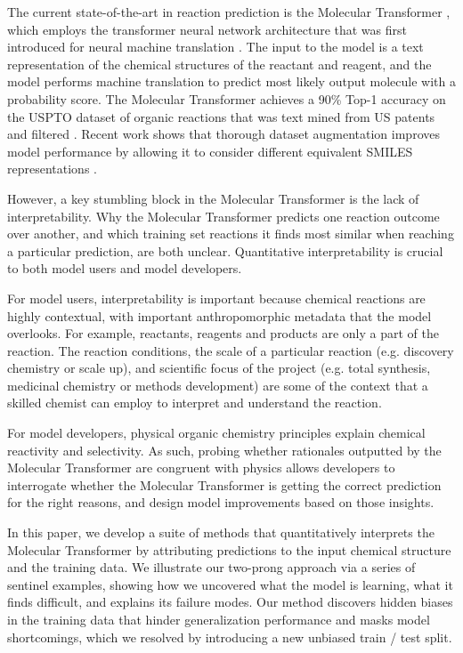 The current state-of-the-art in reaction prediction is the Molecular Transformer \cite{Schwaller2019}, which employs the transformer neural network architecture that was first introduced for neural machine translation \cite{Vaswani2017}. The input to the model is a text representation of the chemical structures of the reactant and reagent, and the model performs machine translation to predict most likely output molecule with a probability score. The Molecular Transformer achieves a 90\% Top-1 accuracy on the USPTO dataset of organic reactions that was text mined from US patents \cite{Lowe2012} and filtered \cite{Jin2017}. Recent work shows that thorough dataset augmentation improves model performance by allowing it to consider different equivalent SMILES representations \cite{tetko2020state}.

However, a key stumbling block in the Molecular Transformer is the lack of interpretability. Why the Molecular Transformer predicts one reaction outcome over another, and which training set reactions it finds most similar when reaching a particular prediction, are both unclear. Quantitative interpretability is crucial to both model users and model developers.

For model users, interpretability is important because chemical reactions are highly contextual, with important anthropomorphic metadata that the model overlooks. For example, reactants, reagents and products are only a part of the reaction. The reaction conditions, the scale of a particular reaction (e.g. discovery chemistry or scale up), and scientific focus of the project (e.g. total synthesis, medicinal chemistry or methods development) are some of the context that a skilled chemist can employ to interpret and understand the reaction.

For model developers, physical organic chemistry principles explain chemical reactivity and selectivity. As such, probing whether rationales outputted by the Molecular Transformer are congruent with physics allows developers to interrogate whether the Molecular Transformer is getting the correct prediction for the right reasons, and design model improvements based on those insights. 

In this paper, we develop a suite of methods that quantitatively interprets the Molecular Transformer by attributing predictions to the input chemical structure and the training data. We illustrate our two-prong approach via a series of sentinel examples,  showing how we uncovered what the model is learning, what it finds difficult, and explains its failure modes. Our method discovers hidden biases in the training data that hinder generalization performance and masks model shortcomings, which we resolved by introducing a new unbiased train / test split. 

